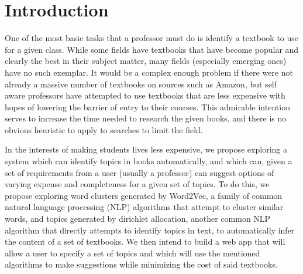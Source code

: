 
\section{Introduction}
One of the most basic tasks that a professor must do is identify a textbook to use for a given class.
While some fields have textbooks that have become popular and clearly the best in their subject matter, many fields (especially emerging ones) have no such exemplar.  
It would be a complex enough problem if there were not already a massive number of textbooks on sources such as Amazon, but self aware professors have attempted to use textbooks that are less expensive with hopes of lowering the barrier of entry to their courses.  
This admirable intention serves to increase the time needed to research the given books, and there is no obvious heuristic to apply to searches to limit the field.  

In the interests of making students lives less expensive, we propose exploring a system which can identify topics in books automatically, and which can, given a set of requirements from a user (usually a professor) can suggest options of varying expense and completeness for a given set of topics.  To do this, we propose exploring word clusters generated by Word2Vec, a family of common natural language processing (NLP) algorithms that attempt to cluster similar words, and topics generated by dirichlet allocation, another common NLP algorithm that directly attempts to identify topics in text, to automatically infer the content of a set of textbooks.  We then intend to build a web app that will allow a user to specify a set of topics and which will use the mentioned algorithms to make suggestions while minimizing the cost of said textbooks.  